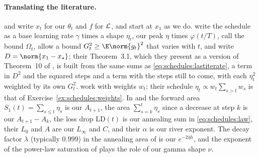 \begin{refsection}
\paragraph{Translating the literature.} \Textcite{DefazioEtAl2023} and \textcite{SchaippEtAl2025} write $x_t$ for our $\theta_t$ and $f$ for $\mathcal{L}$, and start at $x_1$ as we do. \Textcite{SchaippEtAl2025} write the schedule as a base learning rate $\gamma$ times a shape $\eta_t$, our peak $\eta$ times $\varphi(t/T)$, call the bound $\Omega_t$, allow a bound $G_t^2\ge\E\norm{g_t}^2$ that varies with $t$, and write $D=\norm{x_1-x_\star}$; their Theorem~3.1, which they present as a version of Theorem~10 of \textcite{DefazioEtAl2023}, is built from the same sums as \eqref{eq:schedules:lastiterate}, a term in $D^2$ and the squared steps and a term with the steps still to come, with each $\eta_t^2$ weighted by its own $G_t^2$. \Textcite{DefazioEtAl2023} work with weights $w_t$; their schedule $\eta_t\propto w_t\sum_{s>t}w_s$ is that of Exercise~\ref{ex:schedules:weights}. In \textcite{TissueEtAl2025} and \textcite{LuoEtAl2025} the forward area $S_1(t)=\sum_{s\le t}\eta_s$ is our $A_{t+1}$, the area $\sum_{s=k}^{t}\eta_s$ since a decrease at step $k$ is our $A_{t+1}-A_k$, the loss drop $\mathrm{LD}(t)$ is our annealing sum in \eqref{eq:schedules:law}, their $L_0$ and $A$ are our $L_\infty$ and $C$, and their $\alpha$ is our river exponent. The decay factor $\lambda$ (typically $0.999$) in the annealing area of \textcite{TissueEtAl2025} is our $e^{-2\bar\eta h}$, and the exponent of the power-law saturation of \textcite{LuoEtAl2025} plays the role of our gamma shape $\nu$.

\printchapterbib
\end{refsection}
